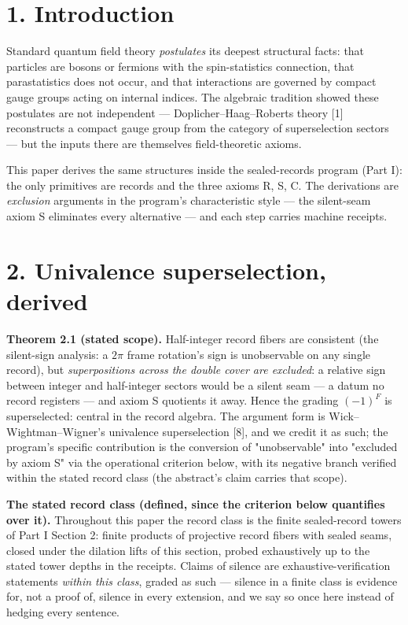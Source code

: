 \documentclass[11pt]{article}
\begin{document}
\section*{1. Introduction}
Standard quantum field theory \emph{postulates} its deepest structural facts: that particles are bosons or fermions with the spin-statistics connection, that parastatistics does not occur, and that interactions are governed by compact gauge groups acting on internal indices.  The algebraic tradition showed these postulates are not independent — Doplicher–Haag–Roberts theory [1] reconstructs a compact gauge group from the category of superselection sectors — but the inputs there are themselves field-theoretic axioms.

This paper derives the same structures inside the sealed-records program (Part I): the only primitives are records and the three axioms R, S, C.  The derivations are \emph{exclusion} arguments in the program's characteristic style — the silent-seam axiom S eliminates every alternative — and each step carries machine receipts.

\section*{2. Univalence superselection, derived}
\textbf{Theorem 2.1 (stated scope).}  Half-integer record fibers are consistent (the silent-sign analysis: a $2\pi$ frame rotation's sign is unobservable on any single record), but \emph{superpositions across the double cover are excluded}: a relative sign between integer and half-integer sectors would be a silent seam — a datum no record registers — and axiom S quotients it away.  Hence the grading $(-1)^F$ is superselected: central in the record algebra.  The argument form is Wick–Wightman–Wigner's univalence superselection [8], and we credit it as such; the program's specific contribution is the conversion of "unobservable" into "excluded by axiom S" via the operational criterion below, with its negative branch verified within the stated record class (the abstract's claim carries that scope).

\textbf{The stated record class (defined, since the criterion below quantifies over it).}  Throughout this paper the record class is the finite sealed-record towers of Part I Section 2: finite products of projective record fibers with sealed seams, closed under the dilation lifts of this section, probed exhaustively up to the stated tower depths in the receipts.  Claims of silence are exhaustive-verification statements \emph{within this class}, graded as such — silence in a finite class is evidence for, not a proof of, silence in every extension, and we say so once here instead of hedging every sentence.
\end{document}

